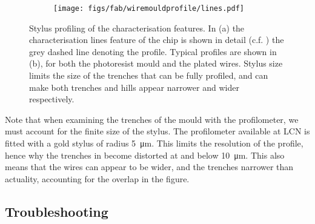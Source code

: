 \begin{figure}[h]
  \centering
  \begin{subfigure}[b]{0.3\textwidth}
    \texttt{[image: figs/fab/wiremouldprofile/lines.pdf]}
    \vspace{1cm}
    \caption{}
  \end{subfigure}
  \hspace{1cm}
  \begin{subfigure}[b]{0.55\textwidth}
    \caption{}
  \end{subfigure}
  \caption[Stylus profiling characterisation features]{
    Stylus profiling of the characterisation features. In (a) the
  characterisation lines feature of the chip is shown in detail (c.f.
  ) the grey dashed line denoting the
  profile. Typical profiles are shown in (b), for both the photoresist
  mould and the plated wires. Stylus size limits the size of the trenches that
  can be fully profiled, and can make both trenches and hills appear narrower
  and wider respectively.
  }
  \label{fab:fig:chipprofile}
\end{figure}

Note that when examining the trenches of the mould with the profilometer, we
must account for the finite size of the stylus.
The profilometer available at LCN is fitted with a gold stylus of radius
\SI{5}{\micro\meter}. This limits the resolution of the profile, hence why the
trenches in  become distorted at and below
\SI{10}{\micro\meter}. This also means that the wires can appear to be 
wider, and the trenches narrower than actuality, accounting for the overlap in the
figure.

\subsection{Troubleshooting}

